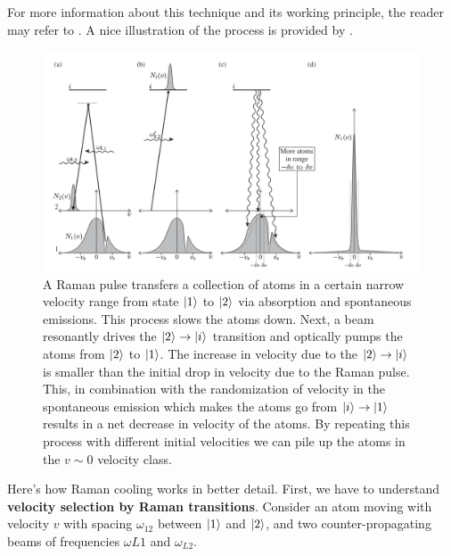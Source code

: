 \documentclass{book}
\theoremstyle{definition}
\begin{document}
For more information about this technique and its working principle, the reader may refer to \cite{PhysRevLett.69.1741}. A nice illustration of the process is provided by \cite{foot2005atomic}.


\begin{figure}[!htb]
	\centering
	\includegraphics[width = \textwidth]{images/raman-cooling.png}
	\caption{A Raman pulse transfers a collection of atoms in a certain narrow velocity range from state $\ket{1}$ to $\ket{2}$ via absorption and spontaneous emissions. This process slows the atoms down. Next, a beam resonantly drives the $\ket{2}\to \ket{i}$ transition and optically pumps the atoms from $\ket{2}$ to $\ket{1}$. The increase in velocity due to the $\ket{2}\to \ket{i}$ is smaller than the initial drop in velocity due to the Raman pulse. This, in combination with the randomization of velocity in the spontaneous emission which makes the atoms go from $\ket{i}\to \ket{1}$ results in a net decrease in velocity of the atoms. By repeating this process with different initial velocities we can pile up the atoms in the $v\sim 0$ velocity class.}
\end{figure}



Here's how Raman cooling works in better detail. First, we have to understand \textbf{velocity selection by Raman transitions}. Consider an atom moving with velocity $v$ with spacing $\omega_{12}$ between $\ket{1}$ and $\ket{2}$, and two counter-propagating beams of frequencies $\omega{L1}$ and $\omega_{L2}$.
\end{document}

